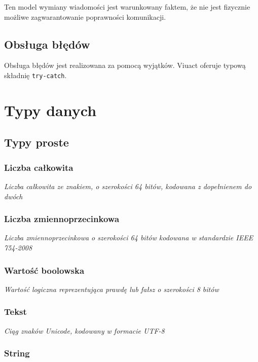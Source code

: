 \documentclass[11pt,oneside,a4paper,titlepage,onecolumn]{article}
\begin{document}
Ten model wymiany wiadomości jest warunkowany faktem, że nie jest fizycznie
możliwe zagwarantowanie poprawności komunikacji.

\subsection{Obsługa błędów}

Obsługa błędów jest realizowana za pomocą wyjątków. Viuact oferuje typową
składnię \texttt{try-catch}.

\newpage
\section{Typy danych}

\subsection{Typy proste}

\subsubsection{Liczba całkowita}

\emph{Liczba całkowita ze znakiem, o szerokości 64 bitów, kodowana z dopełnienem do
dwóch}

\subsubsection{Liczba zmiennoprzecinkowa}

\emph{Liczba zmiennoprzecinkowa o szerokości 64 bitów kodowana w standardzie IEEE 754-2008}

\subsubsection{Wartość boolowska}

\emph{Wartość logiczna reprezentująca prawdę lub fałsz o szerokości 8 bitów}

\subsubsection{Tekst}

\emph{Ciąg znaków Unicode, kodowany w formacie UTF-8}

\subsubsection{String}
\end{document}
